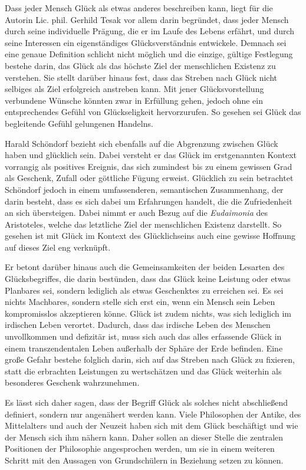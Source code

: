 Dass jeder Mensch Glück als etwas anderes beschreiben kann, liegt für die Autorin Lic. phil. Gerhild Tesak vor allem  darin begründet, dass jeder Mensch durch seine individuelle Prägung, die er im Laufe des Lebens erfährt, und durch seine Interessen ein eigenständiges Glücksverständnis entwickele.
Demnach sei eine genaue Definition schlicht nicht möglich und die einzige, gültige Festlegung bestehe darin, das Glück als das höchste Ziel der menschlichen Existenz zu verstehen. 
 Sie stellt darüber hinaus fest, dass das Streben nach Glück nicht selbiges als Ziel erfolgreich anstreben kann. 
 Mit jener Glücksvorstellung verbundene Wünsche könnten zwar in Erfüllung gehen, jedoch ohne ein entsprechendes Gefühl von Glückseligkeit hervorzurufen\cite{GT16}.
 So gesehen sei Glück \glqq das begleitende Gefühl gelungenen Handelns\grqq.
 
Harald Schöndorf bezieht sich ebenfalls auf die Abgrenzung zwischen \glqq Glück haben\grqq{} und \glqq glücklich sein\grqq{}. 
Dabei versteht er das Glück im erstgenannten Kontext vorrangig als positives Ereignis, das sich \glqq zumindest bis zu einem gewissen Grad als Geschenk, Zufall oder göttliche Fügung erweist.\grqq{} 
Glücklich zu sein betrachtet Schöndorf jedoch in einem umfassenderen, semantischen Zusammenhang, der darin besteht, dass es sich dabei um Erfahrungen handelt, die die Zufriedenheit an sich übersteigen. 
Dabei nimmt er auch Bezug auf die \textit{Eudaimonia} des Aristoteles, welche das letztliche Ziel der menschlichen Existenz darstellt. 
So gesehen ist mit Glück im Kontext des \glqq Glücklichseins\grqq{} auch eine gewisse Hoffnung auf dieses Ziel eng verknüpft.

Er betont darüber hinaus auch die Gemeinsamkeiten der beiden Lesarten des Glücksbegriffes, die darin bestünden, dass das Glück keine Leistung oder etwas Planbares sei, sondern lediglich als etwas Geschenktes zu erreichen sei. 
Es sei nichts Machbares, sondern stelle sich erst ein, wenn ein Mensch sein Leben kompromisslos akzeptieren könne\cite[S.\,175]{WB13}.
Glück ist zudem nichts, was sich lediglich im irdischen Leben verortet. 
Dadurch, dass das irdische Leben des Menschen unvollkommen und defizitär ist, muss sich auch das alles erfassende Glück in einem transzendentalen Leben außerhalb der Sphäre der Erde befinden. 
Eine große Gefahr bestehe folglich darin, sich auf das Streben nach Glück zu fixieren, statt die erbrachten Leistungen zu wertschätzen und das Glück weiterhin als besonderes Geschenk wahrzunehmen\cite[S.\,175]{WB13}.

Es lässt sich daher sagen, dass der Begriff \glqq Glück\grqq{} als solches nicht abschließend definiert, sondern nur angenähert werden kann. 
Viele Philosophen der Antike, des Mittelalters und auch der Neuzeit haben sich mit dem Glück beschäftigt und wie der Mensch sich ihm nähern kann. 
Daher sollen an dieser Stelle die zentralen Positionen der Philosophie angesprochen werden, um sie in einem weiteren Schritt mit den Aussagen von Grundschülern in Beziehung setzen zu können.


